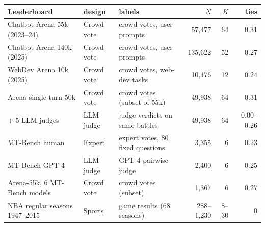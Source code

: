\begin{tabular}{lllrrr}
\toprule
Leaderboard & design & labels & $N$ & $K$ & ties \\
\midrule
Chatbot Arena 55k (2023--24) & Crowd vote & crowd votes, user prompts & 57,477 & 64 & 0.31 \\
Chatbot Arena 140k (2025) & Crowd vote & crowd votes, user prompts & 135,622 & 52 & 0.27 \\
WebDev Arena 10k (2025) & Crowd vote & crowd votes, web-dev tasks & 10,476 & 12 & 0.24 \\
Arena single-turn 50k & Crowd vote & crowd votes (subset of 55k) & 49,938 & 64 & 0.31 \\
\quad + 5 LLM judges & LLM judge & judge verdicts on same battles & 49,938 & 64 & 0.00--0.26 \\
MT-Bench human & Expert & expert votes, 80 fixed questions & 3,355 & 6 & 0.23 \\
MT-Bench GPT-4 & LLM judge & GPT-4 pairwise judge & 2,400 & 6 & 0.25 \\
Arena-55k, 6 MT-Bench models & Crowd vote & crowd votes (subset) & 1,367 & 6 & 0.27 \\
NBA regular seasons 1947--2015 & Sports & game results (68 seasons) & 288--1,230 & 8--30 & 0 \\
\bottomrule
\end{tabular}
